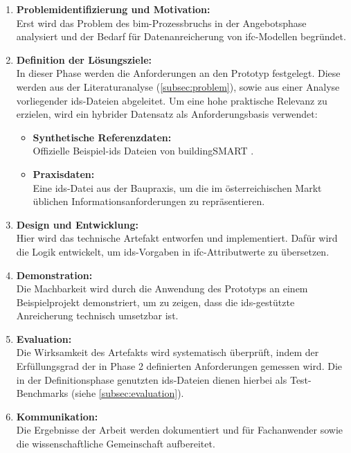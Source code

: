 \begin{enumerate}
    \item \textbf{Problemidentifizierung und Motivation:} \\
    Erst wird das Problem des \gls{bim}-Prozessbruchs in der Angebotsphase analysiert und der 
    Bedarf für Datenanreicherung von \gls{ifc}-Modellen begründet.

\item \textbf{Definition der Lösungsziele:} \\
    In dieser Phase werden die Anforderungen an den Prototyp festgelegt. Diese werden 
    aus der Literaturanalyse (\ref{subsec:problem}), sowie aus einer Analyse vorliegender 
    \gls{ids}-Dateien abgeleitet. Um eine hohe praktische Relevanz zu erzielen, 
    wird ein hybrider Datensatz als Anforderungsbasis verwendet:
    \begin{itemize}
        \item \textbf{Synthetische Referenzdaten:} \\
        Offizielle Beispiel-\gls{ids} Dateien von buildingSMART \cite{sampleIDS}.
        \item \textbf{Praxisdaten:} \\
        Eine \gls{ids}-Datei aus der Baupraxis, um die im österreichischen Markt üblichen 
        Informationsanforderungen zu repräsentieren.
    \end{itemize}

    \item \textbf{Design und Entwicklung:} \\
    Hier wird das technische Artefakt entworfen und implementiert. 
    Dafür wird die Logik entwickelt, um \gls{ids}-Vorgaben in 
    \gls{ifc}-Attributwerte zu übersetzen.

    \newpage

    \item \textbf{Demonstration:} \\
    Die Machbarkeit wird durch die Anwendung des Prototyps an einem Beispielprojekt 
    demonstriert, um zu zeigen, dass die \gls{ids}-gestützte Anreicherung technisch umsetzbar ist.

    \item \textbf{Evaluation:} \\
    Die Wirksamkeit des Artefakts wird systematisch überprüft, indem der Erfüllungsgrad der 
    in Phase 2 definierten Anforderungen gemessen wird. Die in der Definitionsphase genutzten 
    \gls{ids}-Dateien dienen hierbei als Test-Benchmarks (siehe \ref{subsec:evaluation}).

    \item \textbf{Kommunikation:} \\
    Die Ergebnisse der Arbeit werden dokumentiert und für Fachanwender sowie die 
    wissenschaftliche Gemeinschaft aufbereitet.
\end{enumerate}


